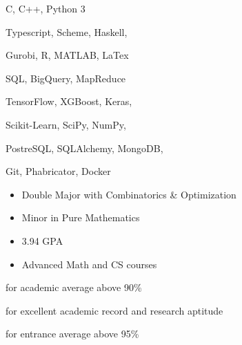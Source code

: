 C, C++, Python 3
\smallskip

Typescript, Scheme, Haskell,
\smallskip

Gurobi, R, MATLAB, LaTex

\divider\smallskip

SQL, BigQuery, MapReduce
\smallskip

TensorFlow, XGBoost, Keras,
\smallskip

Scikit-Learn, SciPy, NumPy,
\smallskip

PostreSQL, SQLAlchemy, MongoDB,

\divider\smallskip

Git, Phabricator, Docker


\begin{itemize}
    \item Double Major with Combinatorics \& Optimization
    \item Minor in Pure Mathematics
    \item 3.94 GPA
    \item Advanced Math and CS courses
\end{itemize}


for academic average above 90\%

\divider\smallskip

for excellent academic record and research aptitude

\divider\smallskip


\divider\smallskip

for entrance average above 95\%

